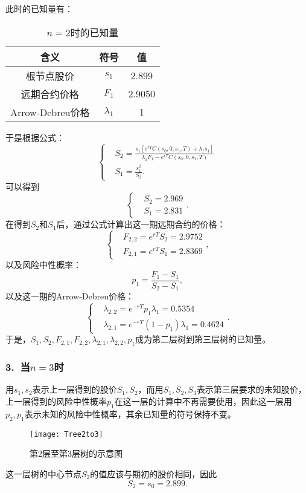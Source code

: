 此时的已知量有：
\begin{table}[H]
	\centering
	\caption{$n=2$时的已知量}
	\begin{tabular}{|c|c|c|}
		\hline
		含义&符号&值 \\\hline
		根节点股价&$s_1$&2.899\\\hline
		远期合约价格&$F_1$&2.9050 \\\hline
		Arrow-Debreu价格&$\lambda_1$&1\\\hline
	\end{tabular}
\end{table}
于是根据公式：
\begin{equation*}
	\left\{
	\begin{aligned}
		& S_2 = \frac{s_1\left[e^{rT}C(s_0,0,s_1,T)+\lambda_1s_1\right]}{\lambda_1F_1-e^{rT}C(s_0,0,s_1,T)}\\
		&S_1 = \frac{s_1^2}{S_2}.
	\end{aligned}
	\right.
\end{equation*}
可以得到
\begin{equation*}
	\left\{
	\begin{aligned}
		& S_2 = 2.969\\ 
		&S_1 = 2.831
	\end{aligned}
	\right. .
\end{equation*}
在得到$S_2$和$S_1$后，通过公式计算出这一期远期合约的价格：
\begin{equation*}
	\left\{
	\begin{aligned}
		& F_{2,2} = e^{rT}S_2 = 2.9752 \\
		&F_{2,1} = e^{rT}S_1 = 2.8369
	\end{aligned}
	\right. ,
\end{equation*}
以及风险中性概率：
$$p_1 = \frac{F_1-S_1}{S_2-S_1},$$
以及这一期的Arrow-Debreu价格：
\begin{equation*}
	\left\{
	\begin{aligned}
		& \lambda_{2,2} = e^{-rT}p_1\lambda_1= 0.5354 \\
		&\lambda_{2,1} = e^{-rT}(1-p_1)\lambda_1 = 0.4624
	\end{aligned}
	\right. .
\end{equation*}
于是，$S_1,S_2,F_{2,1},F_{2,2},\lambda_{2,1},\lambda_{2,2},p_1$成为第二层树到第三层树的已知量。

\subsubsection{3. $\ $当$n=3$时}
用$s_1,s_2$表示上一层得到的股价$S_1,S_2$，而用$S_1,S_2,S_3$表示第三层要求的未知股价，上一层得到的风险中性概率$p_1$在这一层的计算中不再需要使用，因此这一层用$p_2,p_1$表示未知的风险中性概率，其余已知量的符号保持不变。
\begin{figure}[H]
	\centering
	\texttt{[image: Tree2to3]}
	\caption{第2层至第3层树的示意图}
\end{figure}
这一层树的中心节点$S_2$的值应该与期初的股价相同，因此
$$S_2 = s_0 = 2.899.$$

